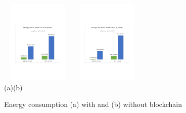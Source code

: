 \documentclass[final,5p,times,twocolumn]{elsarticle}
\begin{document}
%
\begin{figure}[h]
	\begin{center}
	\centering
		\includegraphics[width=35mm, height=40mm]{Energy1}
		\hspace{20pt}
		\includegraphics[width=35mm, height=40mm]{Energy2}\\
        \footnotesize{(a)\hspace{120pt}(b)}\\		 
   	\caption{Energy consumption (a) with and (b) without blockchain} \label{fig:energy}
	\end{center}
\end{figure}
%
%
\end{document}
